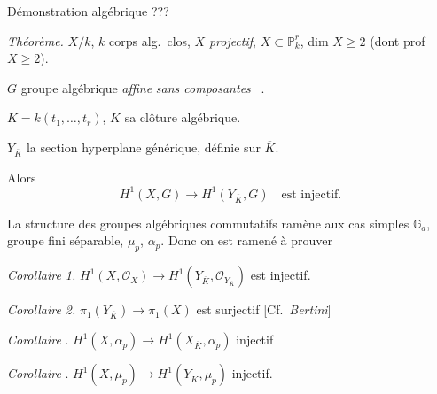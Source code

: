 \documentclass[11pt,a4paper]{article}
\begin{document}
Démonstration algébrique ???


\emph{Théorème.} $X/k$, $k$ corps alg.\ clos, $X$ \struck{\ill{}}  \emph{projectif}, $X \subset \mathbb{P}^r_k$,  dim $X \geqslant 2$ (dont prof $X \geqslant 2$).

$G$ groupe algébrique \struck{\ill{}} \emph{affine} \emph{sans composantes} \ .

$K = k(t_1, \dots, t_r)$, $\overline{K}$ sa clôture algébrique.

$Y_{\overline{K}}$ la section hyperplane générique, définie sur $\overline{K}$.

Alors
\[
  H^1(X, G) \longrightarrow H^1(Y_{\overline{K}}, G) \quad \text{est injectif.}
\]

La structure des groupes algébriques commutatifs  ramène aux cas simples $\mathbb{G}_a$, \struck{\ill{}} groupe fini séparable, $\mu_p$, $\alpha_p$. Donc on est ramené à prouver

\emph{Corollaire 1.} $H^1(X, \mathcal{O}_X) \to H^1(Y_{\overline{K}}, \mathcal{O}_{Y_{\overline{K}}})$ est injectif.


\emph{Corollaire 2.} $\pi_1(Y_{\overline{K}}) \to \pi_1(X)$ est surjectif [Cf.\ \emph{Bertini}]

\emph{Corollaire}  . $H^1(X, \alpha_p) \to H^1(X_{\overline{K}}, \alpha_p)$ injectif

\emph{Corollaire}  . $H^1(X, \mu_p) \to H^1(Y_{\overline{K}}, \mu_p)$ injectif.
\end{document}
